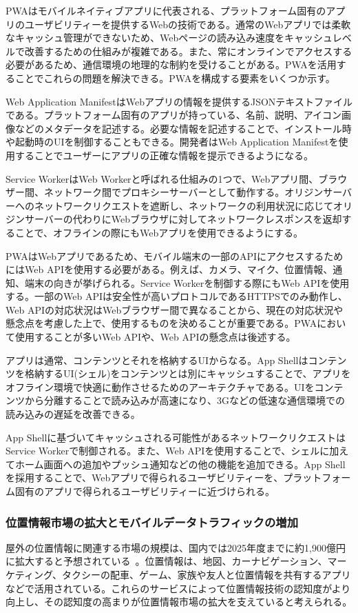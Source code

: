 PWAはモバイルネイティブアプリに代表される、プラットフォーム固有のアプリのユーザビリティーを提供するWebの技術である。通常のWebアプリでは柔軟なキャッシュ管理ができないため、Webページの読み込み速度をキャッシュレベルで改善するための仕組みが複雑である。また、常にオンラインでアクセスする必要があるため、通信環境の地理的な制約を受けることがある。PWAを活用することでこれらの問題を解決できる。PWAを構成する要素をいくつか示す。

Web Application ManifestはWebアプリの情報を提供するJSONテキストファイルである。プラットフォーム固有のアプリが持っている、名前、説明、アイコン画像などのメタデータを記述する。必要な情報を記述することで、インストール時や起動時のUIを制御することもできる。開発者はWeb Application Manifestを使用することでユーザーにアプリの正確な情報を提示できるようになる。

Service WorkerはWeb Workerと呼ばれる仕組みの1つで、Webアプリ間、ブラウザー間、ネットワーク間でプロキシーサーバーとして動作する。オリジンサーバーへのネットワークリクエストを遮断し、ネットワークの利用状況に応じてオリジンサーバーの代わりにWebブラウザに対してネットワークレスポンスを返却することで、オフラインの際にもWebアプリを使用できるようにする。

PWAはWebアプリであるため、モバイル端末の一部のAPIにアクセスするためにはWeb APIを使用する必要がある。例えば、カメラ、マイク、位置情報、通知、端末の向きが挙げられる。Service Workerを制御する際にもWeb APIを使用する。一部のWeb APIは安全性が高いプロトコルであるHTTPSでのみ動作し、Web APIの対応状況はWebブラウザー間で異なることから、現在の対応状況や懸念点を考慮した上で、使用するものを決めることが重要である。PWAにおいて使用することが多いWeb APIや、Web APIの懸念点は後述する。

アプリは通常、コンテンツとそれを格納するUIからなる。App Shellはコンテンツを格納するUI(シェル)をコンテンツとは別にキャッシュすることで、アプリをオフライン環境で快適に動作させるためのアーキテクチャである。UIをコンテンツから分離することで読み込みが高速になり、3Gなどの低速な通信環境での読み込みの遅延を改善できる。

App Shellに基づいてキャッシュされる可能性があるネットワークリクエストはService Workerで制御される。また、Web APIを使用することで、シェルに加えてホーム画面への追加やプッシュ通知などの他の機能を追加できる。App Shellを採用することで、Webアプリで得られるユーザビリティーを、プラットフォーム固有のアプリで得られるユーザビリティーに近づけられる。
\subsubsection{位置情報市場の拡大とモバイルデータトラフィックの増加}
\label{subsubsection:位置情報市場の拡大とモバイルデータトラフィックの増加}
屋外の位置情報に関連する市場の規模は、国内では2025年度までに約1,900億円に拡大すると予想されている~\cite{MIC2023InformationStatistics}。位置情報は、地図、カーナビゲーション、マーケティング、タクシーの配車、ゲーム、家族や友人と位置情報を共有するアプリなどで活用されている。これらのサービスによって位置情報技術の認知度がより向上し、その認知度の高まりが位置情報市場の拡大を支えていると考えられる。

